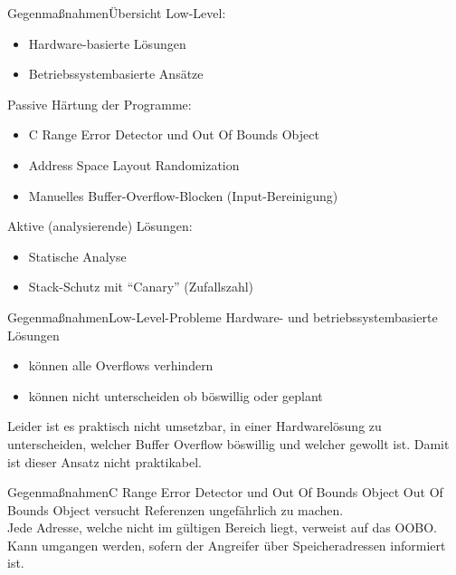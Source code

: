 \pagebreak
\begin{frame}{Gegenmaßnahmen}{Übersicht}
    Low-Level:
\begin{itemize}
    \item Hardware-basierte Lösungen
    \item Betriebssystembasierte Ansätze
\end{itemize}
Passive Härtung der Programme:
\begin{itemize}
    \item C Range Error Detector und Out Of Bounds Object
    \item Address Space Layout Randomization
    \item Manuelles Buffer-Overflow-Blocken (Input-Bereinigung)
\end{itemize}
Aktive (analysierende) Lösungen:
\begin{itemize}
    \item Statische Analyse
    \item Stack-Schutz mit ``Canary'' (Zufallszahl)
\end{itemize}
\end{frame}



\begin{frame}{Gegenmaßnahmen}{Low-Level-Probleme}
    Hardware- und betriebssystembasierte Lösungen
   \begin{itemize}
       \item können alle Overflows verhindern
       \item können nicht unterscheiden ob böswillig oder geplant
   \end{itemize}
    
    Leider ist es praktisch nicht umsetzbar, in einer Hardwarelösung
    zu unterscheiden, welcher Buffer Overflow böswillig und welcher gewollt ist. 
    Damit ist dieser Ansatz nicht praktikabel.
\end{frame}

\begin{frame}{Gegenmaßnahmen}{C Range Error Detector und Out Of Bounds Object}
    Out Of Bounds Object versucht Referenzen ungefährlich zu machen.\\
    Jede
    Adresse, welche nicht im gültigen Bereich liegt, verweist auf das OOBO. \\
    Kann umgangen werden, sofern der Angreifer über Speicheradressen informiert ist. %
\end{frame}




